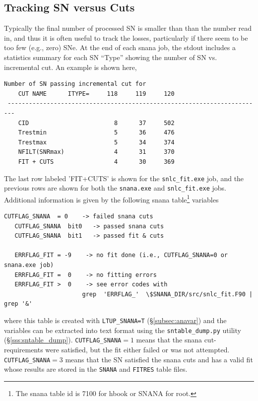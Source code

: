 \documentclass[12pt]{article}
\begin{document}
   \subsection{Tracking SN versus Cuts}
   \label{subsec:sncuts}

Typically the final number of processed SN
is smaller than than the number read in,
and thus it is often useful to track the losses,
particularly if there seem to be too few (e.g., zero)
SNe. At the end of each snana job, the stdout includes
a statistics summary for each SN ``Type'' showing
the number of SN vs. incremental cut. An example 
is shown here,
%
\begin{Verbatim}[frame=single] 
                          Number of SN passing incremental cut for
    CUT NAME      ITYPE=     118     119     120  
 ------------------------------------------------------------------------
    CID                        8      37     502  
    Trestmin                   5      36     476  
    Trestmax                   5      34     374  
    NFILT(SNRmax)              4      31     370  
    FIT + CUTS                 4      30     369  
\end{Verbatim}
%
The last row labeled 'FIT+CUTS' is shown 
for the {\tt snlc\_fit.exe} job,
and the previous rows are shown for both the
{\tt snana.exe} and {\tt snlc\_fit.exe} jobs.
Additional information is given by the following
snana table\footnote{The snana table id is 7100 for hbook or SNANA for root.}
variables
\begin{Verbatim}[frame=single] 
   CUTFLAG_SNANA  = 0    -> failed snana cuts
   CUTFLAG_SNANA  bit0   -> passed snana cuts
   CUTFLAG_SNANA  bit1   -> passed fit & cuts

   ERRFLAG_FIT = -9    -> no fit done (i.e., CUTFLAG_SNANA=0 or snana.exe job)
   ERRFLAG_FIT =  0    -> no fitting errors
   ERRFLAG_FIT >  0    -> see error codes with
                      grep  'ERRFLAG_'  \$SNANA_DIR/src/snlc_fit.F90 | grep '&'
\end{Verbatim}
%
where this table is created with {\tt LTUP\_SNANA=T}
(\S\ref{subsec:anavar}) and the variables can be
extracted into text format using the {\tt sntable\_dump.py}
utility (\S\ref{sss:sntable_dump}).
{\tt CUTFLAG\_SNANA}$=1$ means that the snana cut-requirements
were satisfied, but the fit either failed or was not attempted.
{\tt CUTFLAG\_SNANA}$=3$ means that the SN satisfied the snana cuts
and has a valid fit whose results are stored in the {\tt SNANA} and {\tt FITRES} table files.
\end{document}
